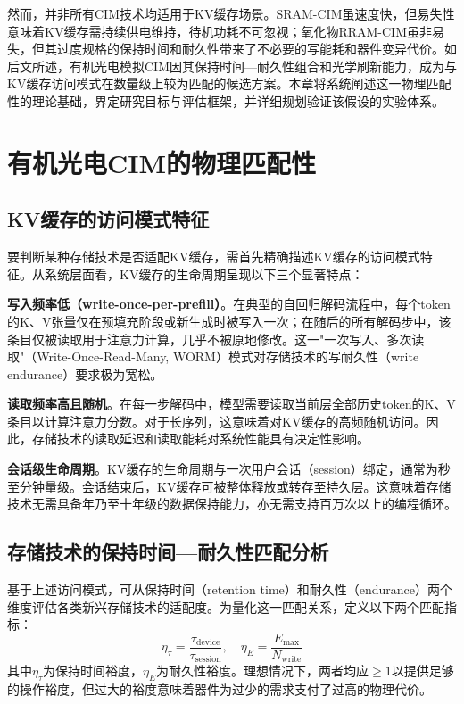 然而，并非所有CIM技术均适用于KV缓存场景。SRAM-CIM虽速度快，但易失性意味着KV缓存需持续供电维持，待机功耗不可忽视；氧化物RRAM-CIM虽非易失，但其过度规格的保持时间和耐久性带来了不必要的写能耗和器件变异代价。如后文所述，有机光电模拟CIM因其保持时间—耐久性组合和光学刷新能力，成为与KV缓存访问模式在数量级上较为匹配的候选方案。本章将系统阐述这一物理匹配性的理论基础，界定研究目标与评估框架，并详细规划验证该假设的实验体系。


\section{有机光电CIM的物理匹配性}
\label{sec:work2_physics_match}

\subsection{KV缓存的访问模式特征}

要判断某种存储技术是否适配KV缓存，需首先精确描述KV缓存的访问模式特征。从系统层面看，KV缓存的生命周期呈现以下三个显著特点：

\textbf{写入频率低（write-once-per-prefill）}。在典型的自回归解码流程中，每个token的K、V张量仅在预填充阶段或新生成时被写入一次；在随后的所有解码步中，该条目仅被读取用于注意力计算，几乎不被原地修改。这一"一次写入、多次读取"（Write-Once-Read-Many, WORM）模式对存储技术的写耐久性（write endurance）要求极为宽松。

\textbf{读取频率高且随机}。在每一步解码中，模型需要读取当前层全部历史token的K、V条目以计算注意力分数。对于长序列，这意味着对KV缓存的高频随机访问。因此，存储技术的读取延迟和读取能耗对系统性能具有决定性影响。

\textbf{会话级生命周期}。KV缓存的生命周期与一次用户会话（session）绑定，通常为秒至分钟量级。会话结束后，KV缓存可被整体释放或转存至持久层。这意味着存储技术无需具备年乃至十年级的数据保持能力，亦无需支持百万次以上的编程循环。

\subsection{存储技术的保持时间—耐久性匹配分析}

基于上述访问模式，可从保持时间（retention time）和耐久性（endurance）两个维度评估各类新兴存储技术的适配度。为量化这一匹配关系，定义以下两个匹配指标：
\begin{equation}
\eta_{\tau} = \frac{\tau_{\text{device}}}{\tau_{\text{session}}}, \quad \eta_{E} = \frac{E_{\text{max}}}{N_{\text{write}}}
\label{eq:match_metrics}
\end{equation}
其中$\eta_{\tau}$为保持时间裕度，$\eta_{E}$为耐久性裕度。理想情况下，两者均应$\geq 1$以提供足够的操作裕度，但过大的裕度意味着器件为过少的需求支付了过高的物理代价。

